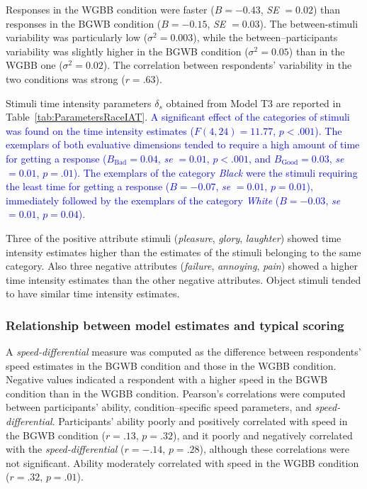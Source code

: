 \documentclass[12pt]{book}
\begin{document}
Responses in the WGBB condition were faster ($B = -0.43$, \emph{SE} $= 0.02$) than responses in the BGWB condition ($B = -0.15$, \emph{SE} $= 0.03$). The between-stimuli variability was particularly low ($\sigma^2 = 0.003$), while the between--participants variability was slightly higher in the BGWB condition ($\sigma^2 = 0.05$) than in the WGBB one ($\sigma^2 = 0.02$). The correlation between respondents' variability in the two conditions was strong ($r = .63$).

Stimuli time intensity parameters $\delta_s$ obtained from Model T3 are reported in Table~\ref{tab:ParametersRaceIAT}. 
\textcolor{blue}{A significant effect of the categories of stimuli was found on the time intensity estimates ($F(4, 24)=11.77$, $p<.001$). 
	The exemplars of both evaluative dimensions tended to require a high amount of time for getting a response ($B_{\text{Bad}}=0.04$, \emph{se} $=0.01$, $p < .001$, and $B_{\text{Good}}= 0.03$, \emph{se} $=0.01$, $p = .01$). 
	The exemplars of the category \emph{Black} were the stimuli requiring the least time for getting a response ($B=-0.07$, \emph{se} $=0.01$, $p = 0.01$), immediately followed by the exemplars of the category \emph{White} ($B=-0.03$, \emph{se} $=0.01$, $p = 0.04$). }

Three of the positive attribute stimuli (\emph{pleasure}, \emph{glory}, \emph{laughter}) showed time intensity estimates higher than the estimates of the stimuli belonging to the same category. Also three negative attributes (\emph{failure}, \emph{annoying}, \emph{pain}) showed a higher time intensity estimates than the other negative attributes. Object stimuli tended to have similar time intensity estimates.

\subsubsection{Relationship between model estimates and typical scoring}
A \emph{speed-differential} measure was computed as the difference between respondents' speed estimates in the BGWB condition and those in the WGBB condition. Negative values indicated a respondent with a higher speed in the BGWB condition than in the WGBB condition. 
Pearson's correlations were computed between participants' ability, condition--specific speed parameters, and \emph{speed-differential}.
Participants' ability poorly and positively correlated with speed in the BGWB condition ($r = .13$, $p = .32$), and it poorly and negatively correlated with the \emph{speed-differential} ($r = -.14$, $p = .28$), although these correlations were not significant. 
Ability moderately correlated with speed in the WGBB condition ($r = .32$, $p = .01$).
\end{document}
